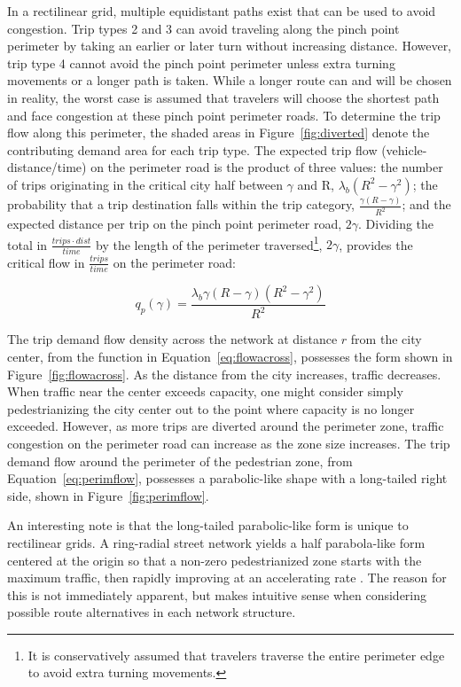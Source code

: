 \documentclass{elsarticle}\usepackage[]{graphicx}\usepackage[]{color}
\begin{document}
\noindent In a rectilinear grid, multiple equidistant paths exist that can be used to avoid congestion. Trip types 2 and 3 can avoid traveling along the pinch point perimeter by taking an earlier or later turn without increasing distance. However, trip type 4 cannot avoid the pinch point perimeter unless extra turning movements or a longer path is taken. While a longer route can and will be chosen in reality, the worst case is assumed that travelers will choose the shortest path and face congestion at these pinch point perimeter roads. To determine the trip flow along this perimeter, the shaded areas in Figure~\ref{fig:diverted} denote the contributing demand area for each trip type. The expected trip flow (vehicle-distance/time) on the perimeter road is the product of three values: the number of trips originating in the critical city half between $\gamma$ and R, $\lambda_b (R^2 - \gamma^2)$; the probability that a trip destination falls within the trip category, $\frac{\gamma(R-\gamma)}{R^2}$; and the expected distance per trip on the pinch point perimeter road, $2\gamma$. Dividing the total in $\frac{trips \cdot dist}{time}$ by the length of the perimeter traversed\footnote{It is conservatively assumed that travelers traverse the entire perimeter edge to avoid extra turning movements.}, $2\gamma$, provides the critical flow in $\frac{trips}{time}$ on the perimeter road:

\begin{equation}
	q_p(\gamma) = \frac{\lambda_b \gamma (R-\gamma) (R^2 - \gamma^2)}{R^2}
    \label{eq:perimflow}
\end{equation}

The trip demand flow density across the network at distance $r$ from the city center, from the function in Equation~\eqref{eq:flowacross}, possesses the form shown in Figure~\ref{fig:flowacross}. As the distance from the city increases, traffic decreases. When traffic near the center exceeds capacity, one might consider simply pedestrianizing the city center out to the point where capacity is no longer exceeded. However, as more trips are diverted around the perimeter zone, traffic congestion on the perimeter road can increase as the zone size increases. The trip demand flow around the perimeter of the pedestrian zone, from Equation~\eqref{eq:perimflow}, possesses a parabolic-like shape with a long-tailed right side, shown in Figure~\ref{fig:perimflow}.

An interesting note is that the long-tailed parabolic-like form is unique to rectilinear grids. A ring-radial street network yields a half parabola-like form centered at the origin so that a non-zero pedestrianized zone starts with the maximum traffic, then rapidly improving at an accelerating rate \citep{Fournier2019}. The reason for this is not immediately apparent, but makes intuitive sense when considering possible route alternatives in each network structure.
\end{document}
